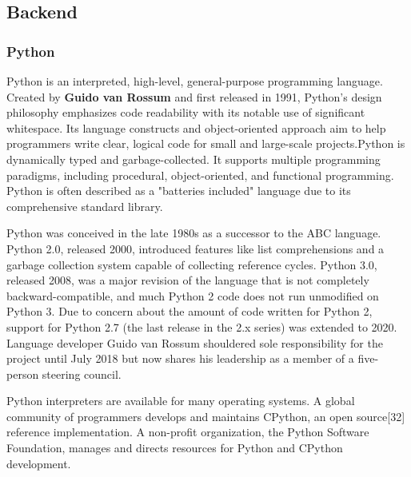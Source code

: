 \documentclass[12pt, a4paper]{report}
\begin{document}
\subsection{Backend}
\subsubsection{Python}
Python is an interpreted, high-level, general-purpose programming language. Created by \textbf{Guido van
	Rossum} and first released in 1991, Python's design philosophy emphasizes code readability with its
notable use of significant whitespace. Its language constructs and object-oriented approach aim to
help programmers write clear, logical code for small and large-scale projects.Python is dynamically
typed and garbage-collected. It supports multiple programming paradigms, including procedural,
object-oriented, and functional programming. Python is often described as a "batteries included"
language due to its comprehensive standard library.
\par Python was conceived in the late 1980s as a successor to the ABC language. Python 2.0, released
2000, introduced features like list comprehensions and a garbage collection system capable of
collecting reference cycles. Python 3.0, released 2008, was a major revision of the language that is
not completely backward-compatible, and much Python 2 code does not run unmodified on Python
3. Due to concern about the amount of code written for Python 2, support for Python 2.7 (the last
release in the 2.x series) was extended to 2020. Language developer Guido van Rossum shouldered
sole responsibility for the project until July 2018 but now shares his leadership as a member of a
five-person steering council.
\par Python interpreters are available for many operating systems. A global community of programmers
develops and maintains CPython, an open source[32] reference implementation. A non-profit
organization, the Python Software Foundation, manages and directs resources for Python and
CPython development.
\end{document}
